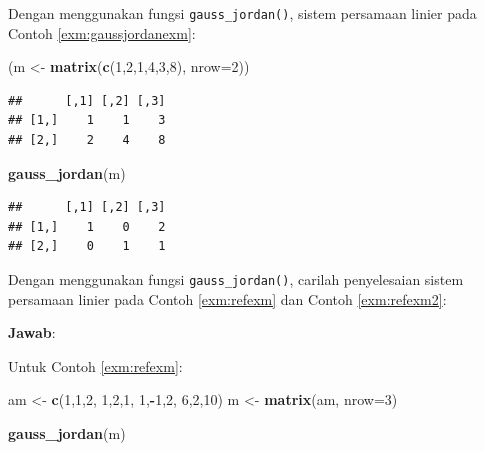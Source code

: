 \documentclass[]{book}
\newenvironment{Shaded}{\begin{snugshade}}{\end{snugshade}}
\newcommand{\DataTypeTok}[1]{\textcolor[rgb]{0.13,0.29,0.53}{#1}}
\newcommand{\DecValTok}[1]{\textcolor[rgb]{0.00,0.00,0.81}{#1}}
\newcommand{\KeywordTok}[1]{\textcolor[rgb]{0.13,0.29,0.53}{\textbf{#1}}}
\newcommand{\NormalTok}[1]{#1}
\newcommand{\OperatorTok}[1]{\textcolor[rgb]{0.81,0.36,0.00}{\textbf{#1}}}
\newcommand{\StringTok}[1]{\textcolor[rgb]{0.31,0.60,0.02}{#1}}
\theoremstyle{definition}
\theoremstyle{definition}
\theoremstyle{definition}
\theoremstyle{remark}
\let\BeginKnitrBlock\begin \let\EndKnitrBlock\end
\begin{document}
Dengan menggunakan fungsi \texttt{gauss\_jordan()}, sistem persamaan linier pada Contoh \ref{exm:gaussjordanexm}:

\begin{Shaded}
\begin{Highlighting}[]
\NormalTok{(m <-}\StringTok{ }\KeywordTok{matrix}\NormalTok{(}\KeywordTok{c}\NormalTok{(}\DecValTok{1}\NormalTok{,}\DecValTok{2}\NormalTok{,}\DecValTok{1}\NormalTok{,}\DecValTok{4}\NormalTok{,}\DecValTok{3}\NormalTok{,}\DecValTok{8}\NormalTok{), }\DataTypeTok{nrow=}\DecValTok{2}\NormalTok{))}
\end{Highlighting}
\end{Shaded}

\begin{verbatim}
##      [,1] [,2] [,3]
## [1,]    1    1    3
## [2,]    2    4    8
\end{verbatim}

\begin{Shaded}
\begin{Highlighting}[]
\KeywordTok{gauss_jordan}\NormalTok{(m)}
\end{Highlighting}
\end{Shaded}

\begin{verbatim}
##      [,1] [,2] [,3]
## [1,]    1    0    2
## [2,]    0    1    1
\end{verbatim}

\BeginKnitrBlock{example}
\protect\hypertarget{exm:gaussjordanexm2}{}{\label{exm:gaussjordanexm2} }Dengan menggunakan fungsi \texttt{gauss\_jordan()}, carilah penyelesaian sistem persamaan linier pada Contoh \ref{exm:refexm} dan Contoh \ref{exm:refexm2}:
\EndKnitrBlock{example}

\textbf{Jawab}:

Untuk Contoh \ref{exm:refexm}:

\begin{Shaded}
\begin{Highlighting}[]
\NormalTok{am <-}\StringTok{ }\KeywordTok{c}\NormalTok{(}\DecValTok{1}\NormalTok{,}\DecValTok{1}\NormalTok{,}\DecValTok{2}\NormalTok{,}
        \DecValTok{1}\NormalTok{,}\DecValTok{2}\NormalTok{,}\DecValTok{1}\NormalTok{,}
        \DecValTok{1}\NormalTok{,}\OperatorTok{-}\DecValTok{1}\NormalTok{,}\DecValTok{2}\NormalTok{,}
        \DecValTok{6}\NormalTok{,}\DecValTok{2}\NormalTok{,}\DecValTok{10}\NormalTok{)}
\NormalTok{m <-}\StringTok{ }\KeywordTok{matrix}\NormalTok{(am, }\DataTypeTok{nrow=}\DecValTok{3}\NormalTok{)}

\KeywordTok{gauss_jordan}\NormalTok{(m)}
\end{Highlighting}
\end{Shaded}
\end{document}
